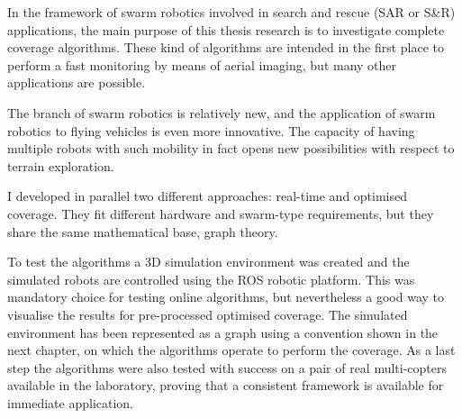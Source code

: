 In the framework of swarm robotics involved in search and rescue (SAR or S\&R) applications, the main purpose of this thesis research is to investigate complete coverage algorithms. These kind of algorithms are intended in the first place to perform a fast monitoring by means of aerial imaging, but many other applications are possible.

The branch of swarm robotics is relatively new, and the application of swarm robotics to flying vehicles is even more innovative. The capacity of having multiple robots with such mobility in fact opens new possibilities with respect to terrain exploration.

I developed in parallel two different approaches: real-time and optimised coverage. They fit different hardware and swarm-type requirements, but they share the same mathematical base, graph theory.

To test the algorithms a 3D simulation environment was created and the simulated robots are controlled using the ROS robotic platform. This was mandatory choice for testing online algorithms, but nevertheless a good way to visualise the results for pre-processed optimised coverage.
The simulated environment has been represented as a graph using a convention shown in the next chapter, on which the algorithms operate to perform the coverage. As a last step the algorithms were also tested with success on a pair of real multi-copters available in the laboratory, proving that a consistent framework is available for immediate application.















